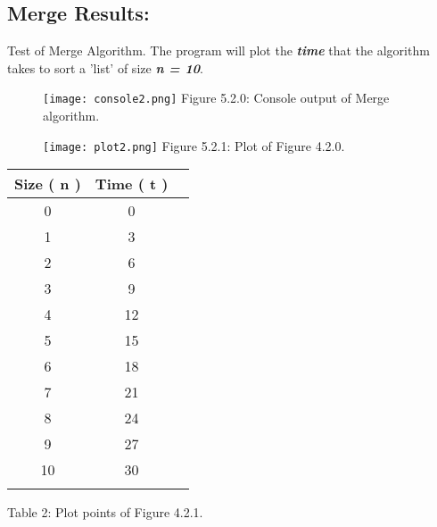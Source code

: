 \subsection{Merge Results:}

Test of Merge Algorithm. The program will plot the {\bfseries\itshape time} that the algorithm takes to sort a 'list' of size {\bfseries\itshape n = 10}.

\begin{figure}[H]
\texttt{[image: console2.png]}
\centering \linebreak \linebreak Figure 5.2.0: Console output of Merge algorithm.
\end{figure} \hfill

\begin{multicols}{2}
\begin{figure}[H]
\texttt{[image: plot2.png]}
\centering \linebreak \linebreak Figure 5.2.1: Plot of Figure 4.2.0.
\end{figure} 

\begin{center}
\begin{itemize}
\end{itemize}
{\Large
\begin{tabular}[.5cm]{c c c }
\toprule
Size ( n ) & Time ( t ) \\
\midrule
0 & 0 \\
\cmidrule{1-2}
1 & 3 \\
\cmidrule{1-2}
2 & 6 \\
\cmidrule{1-2}
3 & 9 \\
\cmidrule{1-2}
4 & 12 \\
\cmidrule{1-2}
5 & 15 \\
\cmidrule{1-2}
6 & 18 \\
\cmidrule{1-2}
7 & 21 \\
\cmidrule{1-2}
8 & 24 \\
\cmidrule{1-2}
9 & 27 \\
\cmidrule{1-2}
10 & 30 \\
\bottomrule
\linebreak
\end{tabular}}
\linebreak \linebreak Table 2: Plot points of Figure 4.2.1.
\end{center}
\end{multicols} \hfill

{\bfseries\itshape\color{armygreen}{Observation:}} {\itshape{}} 

\pagebreak